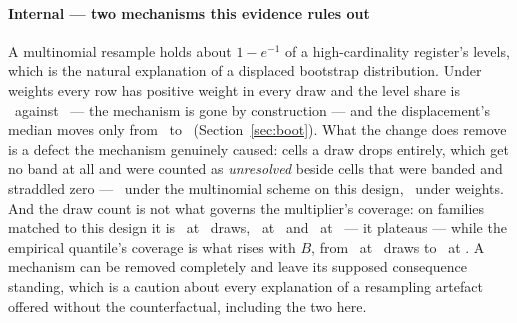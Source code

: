 \paragraph{Internal --- two mechanisms this evidence rules out}
A multinomial resample holds about $1 - e^{-1}$ of a high-cardinality
register's levels, which is the natural explanation of a displaced bootstrap
distribution. Under weights every row has positive weight in every draw and
the level share is \levelShareWeighted\ against \levelShareMult\ --- the
mechanism is gone by construction --- and the displacement's median moves
only from \dispMedianMult\ to \dispMedianWeighted\ (Section~\ref{sec:boot}).
What the change does remove is a defect the mechanism genuinely caused:
cells a draw drops entirely, which get no band at all and were counted as
\emph{unresolved} beside cells that were banded and straddled zero ---
\nUnbandableSameDesign\ under the multinomial scheme on this design,
\nUnbandableCells\ under weights. And the draw count is not what governs the
multiplier's coverage: on families matched to this design it is
\covMultBootOneFifty\ at \nBootOneFifty\ draws, \covMultBootFourHundred\ at
\nBootFourHundred\ and \covMultBootOneThousand\ at \nBootOneThousand\ ---
it plateaus --- while the empirical quantile's coverage is what rises with
$B$, from \covEmpBootThirtyThree\ at \nBootThirtyThree\ draws to
\covEmpBootFourHundred\ at \nBootFourHundred. A mechanism can be removed
completely and leave its supposed consequence standing, which is a caution
about every explanation of a resampling artefact offered without the
counterfactual, including the two here.

